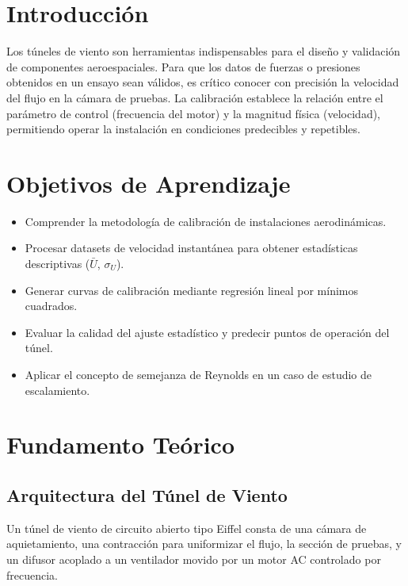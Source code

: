 \documentclass[11pt, a4paper]{article}
\begin{document}
\section{Introducción}
Los túneles de viento son herramientas indispensables para el diseño y validación de componentes aeroespaciales. Para que los datos de fuerzas o presiones obtenidos en un ensayo sean válidos, es crítico conocer con precisión la velocidad del flujo en la cámara de pruebas. La calibración establece la relación entre el parámetro de control (frecuencia del motor) y la magnitud física (velocidad), permitiendo operar la instalación en condiciones predecibles y repetibles.

\section{Objetivos de Aprendizaje}
\begin{itemize}[label=-]
    \item Comprender la metodología de calibración de instalaciones aerodinámicas.
    \item Procesar datasets de velocidad instantánea para obtener estadísticas descriptivas ($\bar{U}$, $\sigma_U$).
    \item Generar curvas de calibración mediante regresión lineal por mínimos cuadrados.
    \item Evaluar la calidad del ajuste estadístico y predecir puntos de operación del túnel.
    \item Aplicar el concepto de semejanza de Reynolds en un caso de estudio de escalamiento.
\end{itemize}

\section{Fundamento Teórico}

\subsection{Arquitectura del Túnel de Viento}
Un túnel de viento de circuito abierto tipo Eiffel consta de una cámara de aquietamiento, una contracción para uniformizar el flujo, la sección de pruebas, y un difusor acoplado a un ventilador movido por un motor AC controlado por frecuencia.
\end{document}
